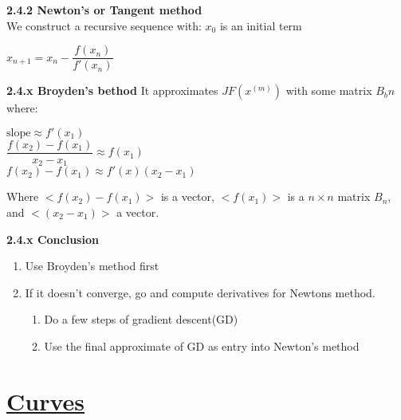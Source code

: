 \documentclass{article}
\begin{document}
\begin{multicols}{2}
	\textbf{2.4.2 Newton's or Tangent method}\\
	We construct a recursive sequence with: $x_0$ is an initial term
	\begin{center}
		\begin{math}
			x_{n+1} = x_n - \dfrac{f(x_n)}{f'(x_n)}
		\end{math}
	\end{center}

	\textbf{2.4.x Broyden's bethod}
	It approximates $JF(x^{(m)})$ with some matrix $B_bn$
	where:
	\begin{center}
		\begin{math}
			\text{slope} \approx f'(x_1)
		\end{math}\\
		\begin{math}
			\dfrac{f(x_2) - f(x_1)} {x_2 - x_1} \approx f(x_1)
		\end{math}\\
		\begin{math}
			f(x_2) - f(x_1) \approx f'(x) (x_2 - x_1)
		\end{math}
	\end{center}
	Where $<f(x_2) - f(x_1)>$ is a vector, $<f(x_1)>$ is a $n \times n$ matrix $B_n$, and
	$<(x_2 - x_1)>$ a vector.

	\textbf{2.4.x Conclusion}
	\begin{enumerate}
		\item Use Broyden's method first
		\item If it doesn't converge, go and compute derivatives for
		      Newtons method.
		      \begin{enumerate}
			      \item Do a few steps of gradient descent(GD)
			      \item Use the final approximate of GD as entry into Newton's method
		      \end{enumerate}
	\end{enumerate}

	\section{\underline{Curves}}

\end{multicols}
\end{document}
